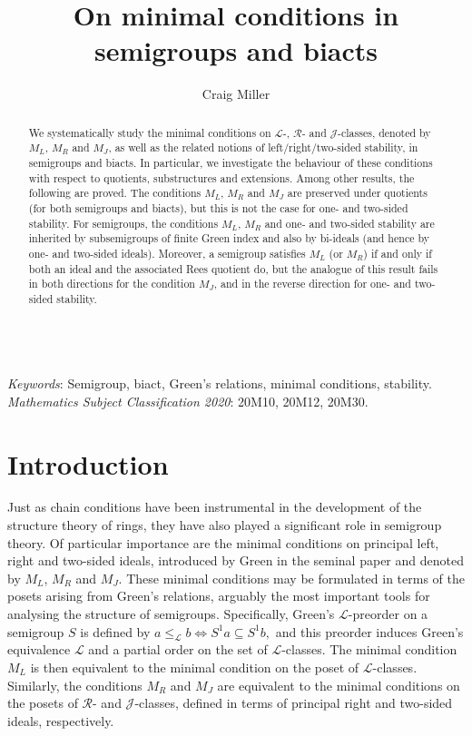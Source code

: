 \documentclass[twoside,a4paper,12pt,reqno]{amsart}
\makeatletter
\newcommand{\citecomment}[2][]{\citen{#2}#1\citevar}
\newcommand{\citeone}[1]{\citecomment{#1}}
\newcommand{\citetwo}[2][]{\citecomment[,~#1]{#2}}
\newcommand{\citevar}{\@ifnextchar\bgroup{;~\citeone}{\@ifnextchar[{;~\citetwo}{]}}}
\newcommand{\citefirst}{\@ifnextchar\bgroup{\citeone}{\@ifnextchar[{\citetwo}{]}}}
\newcommand{\cites}{[\citefirst}
\theoremstyle{plain}
\theoremstyle{definition}
\renewcommand{\l}{\mbox{${\mathcal{L}}$}}
\renewcommand{\r}{\mbox{${\mathcal{R}}$}}
\renewcommand{\j}{\mbox{${\mathcal{J}}$}}
\newcommand{\leql}{\leq_{\mathcal{L}}}
\makeatother
\begin{document}
\title{\large{On minimal conditions in semigroups and biacts}}
\author{Craig Miller}
\address{Department of Mathematics, University of York, UK, YO10 5DD}
\maketitle
\begin{abstract}
We systematically study the minimal conditions on $\l$-, $\r$- and $\j$-classes, denoted by $M_L$, $M_R$ and $M_J$, as well as the related notions of left/right/two-sided stability, in semigroups and biacts.  In particular, we investigate the behaviour of these conditions with respect to quotients, substructures and extensions.  Among other results, the following are proved.  The conditions $M_L$, $M_R$ and $M_J$ are preserved under quotients (for both semigroups and biacts), but this is not the case for one- and two-sided stability.  For semigroups, the conditions $M_L$, $M_R$ and one- and two-sided stability are inherited by subsemigroups of finite Green index and also by bi-ideals (and hence by one- and two-sided ideals).  Moreover, a semigroup satisfies $M_L$ (or $M_R$) if and only if both an ideal and the associated Rees quotient do, but the analogue of this result fails in both directions for the condition $M_J$, and in the reverse direction for one- and two-sided stability.
\end{abstract}
~\\
\textit{Keywords}: Semigroup, biact, Green's relations, minimal conditions, stability.\\
\textit{Mathematics Subject Classification 2020}: 20M10, 20M12, 20M30.
\maketitle

\section{Introduction}\label{sec:intro}

Just as chain conditions have been instrumental in the development of the structure theory of rings, they have also played a significant role in semigroup theory.  Of particular importance are the minimal conditions on principal left, right and two-sided ideals, introduced by Green in the seminal paper \cite{Green} and denoted by $M_L$, $M_R$ and $M_J$.
These minimal conditions may be formulated in terms of the posets arising from Green's relations, arguably the most important tools for analysing the structure of semigroups.  Specifically, Green's $\l$-preorder on a semigroup $S$ is defined by $a\leql b\Leftrightarrow S^1a\subseteq S^1b,$ and this preorder induces Green's equivalence $\l$ and a partial order on the set of $\l$-classes.  The minimal condition $M_L$ is then equivalent to the minimal condition on the poset of $\l$-classes.  Similarly, the conditions $M_R$ and $M_J$ are equivalent to the minimal conditions on the posets of $\r$- and $\j$-classes, defined in terms of principal right and two-sided ideals, respectively.
\end{document}
